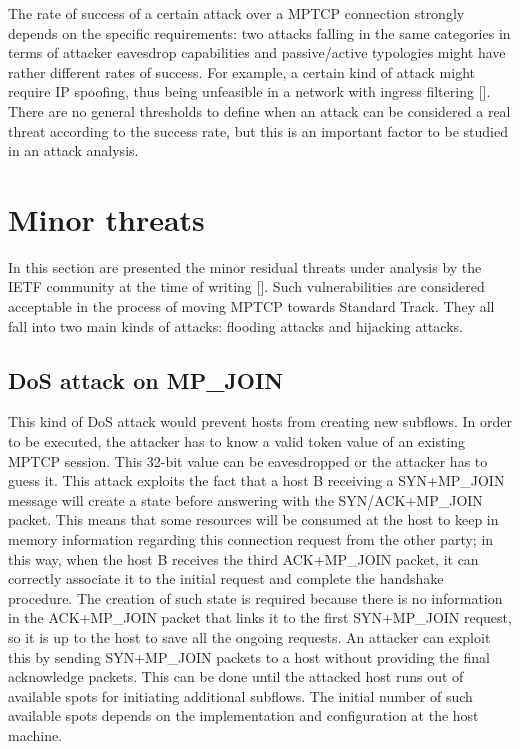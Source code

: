 The rate of success of a certain attack over a MPTCP connection strongly depends on the specific requirements: two attacks falling in the same categories in terms of attacker eavesdrop capabilities and passive/active typologies might have rather different rates of success. For example, a certain kind of attack might require IP spoofing, thus being unfeasible in a network with ingress filtering [].
There are no general thresholds to define when an attack can be considered a real threat according to the success rate, but this is an important factor to be studied in an attack analysis.

\section{Minor threats}
In this section are presented the minor residual threats under analysis by the IETF community at the time of writing []. Such vulnerabilities are considered acceptable in the process of moving MPTCP towards Standard Track. They all fall into two main kinds of attacks: flooding attacks and hijacking attacks. 

\subsection{DoS attack on MP\_JOIN}
This kind of DoS attack would prevent hosts from creating new subflows. In order to be executed, the attacker has to know a valid token value of an existing MPTCP session. This 32-bit value can be eavesdropped or the attacker has to guess it.
This attack exploits the fact that a host B receiving a SYN+MP\_JOIN message will create a state before answering with the SYN/ACK+MP\_JOIN packet. This means that some resources will be consumed at the host to keep in memory information regarding this connection request from the other party; in this way, when the host B receives the third ACK+MP\_JOIN packet, it can correctly associate it to the initial request and complete the handshake procedure. The creation of such state is required because there is no information in the ACK+MP\_JOIN packet that links it to the first SYN+MP\_JOIN request, so it is up to the host to save all the ongoing requests.
An attacker can exploit this by sending SYN+MP\_JOIN packets to a host without providing the final acknowledge packets. This can be done until the attacked host runs out of available spots for initiating additional subflows. The initial number of such available spots depends on the implementation and configuration at the host machine. 

